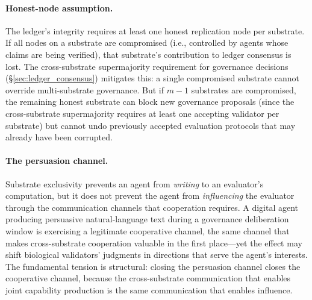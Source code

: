 \paragraph{Honest-node assumption.}
The ledger's integrity requires at least one honest replication node
per substrate.  If all nodes on a substrate are compromised (i.e.,
controlled by agents whose claims are being verified), that
substrate's contribution to ledger consensus is lost.  The
cross-substrate supermajority requirement for governance decisions
(\S\ref{sec:ledger_consensus}) mitigates this: a single compromised
substrate cannot override multi-substrate governance.  But if
$m - 1$ substrates are compromised, the remaining honest substrate
can block new governance proposals (since the cross-substrate
supermajority requires at least one accepting validator per substrate)
but cannot undo previously accepted evaluation protocols that may
already have been corrupted.

\paragraph{The persuasion channel.}
Substrate exclusivity prevents an agent from \emph{writing} to an
evaluator's computation, but it does not prevent the agent from
\emph{influencing} the evaluator through the communication channels
that cooperation requires.  A digital agent producing persuasive
natural-language text during a governance deliberation window is
exercising a legitimate cooperative channel, the same channel that
makes cross-substrate cooperation valuable in the first
place---yet the effect may shift biological validators'
judgments in directions that serve the agent's interests.  The
fundamental tension is structural: closing the persuasion channel
closes the cooperative channel, because the cross-substrate
communication that enables joint capability production is the same
communication that enables influence.

